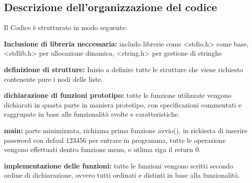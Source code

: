 \documentclass[11pt,a4paper,oneside,openany]{book}
\newenvironment{listacomp}{%
    \small
    \begin{list}{\textendash}{%
        \setlength{\topsep}{2pt}%
        \setlength{\partopsep}{0pt}%
        \setlength{\itemsep}{1pt}%
        \setlength{\parsep}{0pt}%
        \setlength{\leftmargin}{1.2em}%
    }%
}{%
    \end{list}%
}
\begin{document}
\subsection{Descrizione dell'organizzazione del codice}
Il Codice è strutturato in modo seguente:
\begin{listacomp}
\item \textbf{Inclusione di libreria neccessaria:} includo librerie come <stdio.h> come base, <stdlib.h> per allocazione dinamica, <string.h> per gestione di stringhe
\item \textbf{definizione di strutture:} Inizio a definire tutte le strutture che viene richiesto contenente pure i nodi delle liste.
\item \textbf{dichiarazione di funzioni prototipo:} tutte le funzione utilizzate vengono dichiarati in quasta parte in maniera prototipo, con specificazioni commentati e raggrupate in base alle funzionalità svolte e caratteristiche.
\item \textbf{main:} parte minimizzata, richiama prima funzione avvio(), in richiesta di inserire password con defaul 123456 per entrare in programma, tutte le operazione vengono effettuati dentro funzione menu, e utlima riga il return 0.
\item \textbf{implementazione delle funzioni:} tutte le funzioni vengono scritti secondo ordine di dichiarazione, ovvero tutti ordinati e distinti in base alla funzionalità.
\end{listacomp}
\end{document}
